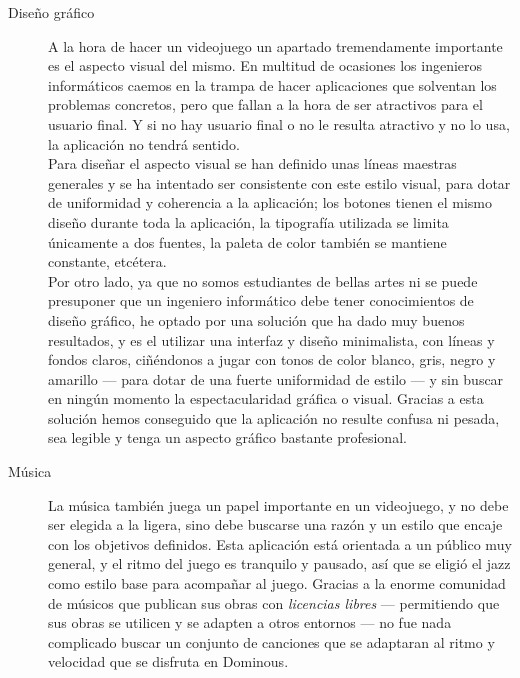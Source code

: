 \begin{description}
    \item[Diseño gráfico] A la hora de hacer un videojuego un apartado tremendamente importante es el aspecto visual del mismo.
        En multitud de ocasiones los ingenieros informáticos caemos en la trampa de hacer aplicaciones que solventan
        los problemas concretos, pero que fallan a la hora de ser atractivos para el usuario final. Y si no hay usuario
        final o no le resulta atractivo y no lo usa, la aplicación no tendrá sentido. \\

        Para diseñar el aspecto visual se han definido unas líneas maestras generales y se ha intentado ser consistente
        con este estilo visual, para dotar de uniformidad y coherencia a la aplicación; los botones tienen el mismo diseño
        durante toda la aplicación, la tipografía utilizada se limita únicamente a dos fuentes, la paleta de color
        también se mantiene constante, etcétera. \\

        Por otro lado, ya que no somos estudiantes de bellas artes ni se puede presuponer que un ingeniero informático
        debe tener conocimientos de diseño gráfico, he optado por una solución que ha dado muy buenos resultados, y es
        el utilizar una interfaz y diseño minimalista, con líneas y fondos claros, ciñéndonos a jugar con tonos de color
        blanco, gris, negro y amarillo --- para dotar de una fuerte uniformidad de estilo --- y sin buscar en ningún
        momento la espectacularidad gráfica o visual. Gracias a esta solución hemos conseguido que la aplicación no
        resulte confusa ni pesada, sea legible y tenga un aspecto gráfico bastante profesional.

    \item[Música] La música también juega un papel importante en un videojuego, y no debe ser elegida a la ligera, sino
        debe buscarse una razón y un estilo que encaje con los objetivos definidos. Esta aplicación está orientada a un
        público muy general, y el ritmo del juego es tranquilo y pausado, así que se eligió el jazz como estilo base
        para acompañar al juego. Gracias a la enorme comunidad de músicos que publican sus obras con \emph{licencias libres}
        --- permitiendo que sus obras se utilicen y se adapten a otros entornos --- no fue nada complicado buscar
        un conjunto de canciones que se adaptaran al ritmo y velocidad que se disfruta en Dominous.


\end{description}
